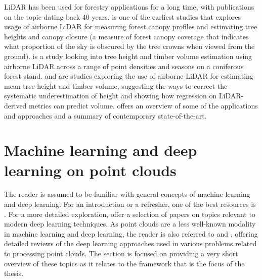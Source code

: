 LiDAR has been used for forestry applications for a long time, with publications on the topic dating back 40 years.
\citet{nelsonDeterminingForestCanopy1984} is one of the earliest studies that explores usage of airborne LiDAR for measuring forest canopy profiles and estimating tree heights and canopy closure (a measure of forest canopy coverage that indicates what proportion of the sky is obscured by the tree crowns when viewed from the ground).
\citet{nilssonEstimationTreeHeights1996} is a study looking into tree height and timber volume estimation using airborne LiDAR across a range of point densities and seasons on a coniferous forest stand.
\citet{naessetDeterminationMeanTree1997} and \citet{naessetEstimatingTimberVolume1997} are studies exploring the use of airborne LiDAR for estimating mean tree height and timber volume, suggesting the ways to correct the systematic underestimation of height and showing how regression on LiDAR-derived metrics can predict volume.
\citet{carson2004lidar} offers an overview of some of the applications and approaches and a summary of contemporary state-of-the-art.

\section{Machine learning and deep learning on point clouds}\label{sec-ml-dl}

The reader is assumed to be familiar with general concepts of machine learning and deep learning.
For an introduction or a refresher, one of the best resources is \citet{goodfellowDeepLearning2016}.
For a more detailed exploration, \citet{wangRecentAdvancesDeep2020} offer a selection of papers on topics relevant to modern deep learning techniques.
As point clouds are a less well-known modality in machine learning and deep learning, the reader is also referred to \citet{belloReviewDeepLearning2020} and \citet{guoDeepLearning3D2021}, offering detailed reviews of the deep learning approaches used in various problems related to processing point clouds.
The section is focused on providing a very short overview of these topics as it relates to the framework that is the focus of the thesis.

